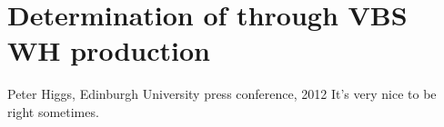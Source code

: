 \chapter{Determination of \lambdaWZ through VBS WH production}
\begin{aquote}{Peter Higgs, Edinburgh University press conference, 2012}
    It's very nice to be right sometimes.
\end{aquote}


